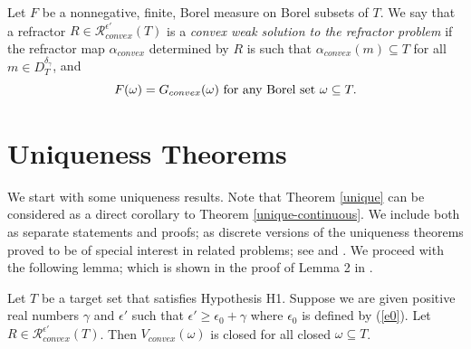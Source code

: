 \documentclass[review]{elsarticle}
\begin{document}
Let $F$ be a nonnegative, finite, Borel measure on Borel subsets of $T$. We say that a refractor $R\in \mathcal{R}_{convex}^{\epsilon'}(T)$ is a {\it convex weak solution to the refractor problem} if the refractor map $\alpha_{convex}$ determined by $R$ is such that $\alpha_{convex}(m)\subseteq T$ for all $m\in D_T^{\delta_\gamma}$, and 
\begin{equation}\label{weak3}
    F(\omega)=G_{convex}(\omega)\textnormal{ for any Borel set } \omega \subseteq T.
\end{equation}

\section{Uniqueness Theorems}

We start with some uniqueness results. Note that Theorem \ref{unique} can be considered as a direct corollary to Theorem \ref{unique-continuous}. We include both as separate statements and proofs; as discrete versions of the uniqueness theorems proved to be of special interest in related problems; see \cite{OK1} and \cite{OK2}. We proceed with the following lemma; which is shown in the proof of Lemma 2 in \cite{KOT}.

\begin{lemma}\label{closed-convex}
    Let $T$ be a target set that satisfies Hypothesis H1. Suppose we are given positive real numbers $\gamma$ and $\epsilon'$ such that $\epsilon'\ge \epsilon_0+\gamma$ where $\epsilon_0$ is defined by (\ref{e0}). Let $R\in \mathcal{R}_{convex}^{\epsilon'}(T)$. Then $V_{convex}(\omega)$ is closed for all closed $\omega\subseteq T$.
\end{lemma}
\end{document}
